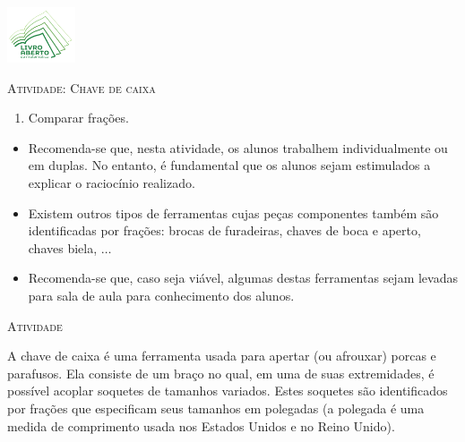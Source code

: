 \documentclass[10 pt,usenames,dvipsnames, oneside]{article}
\begin{document}
\begin{center}
  \begin{minipage}[l]{3cm}
\includegraphics[width=2cm]{../../../Figuras/logo}       
\end{minipage}\hfill
\begin{minipage}[r]{.8\textwidth}
 {\Large \scshape Atividade: Chave de caixa}  
\end{minipage}
\end{center}
\vspace{.2cm}

\ifdefined\prof
\begin{goals}
\begin{enumerate}
\item       Comparar frações.
\end{enumerate}

\tcblower

\begin{itemize}
\item       Recomenda-se que, nesta atividade, os alunos trabalhem
individualmente ou em duplas. No entanto, é fundamental que os alunos sejam
estimulados a explicar o raciocínio realizado.
    \item       Existem outros tipos de ferramentas cujas peças componentes
também são identificadas por frações: brocas de furadeiras, chaves de boca e
aperto, chaves biela,       $\ldots$
    \item       Recomenda-se que, caso seja viável, algumas destas ferramentas
sejam levadas para sala de aula para conhecimento dos alunos.
\end{itemize}
\end{goals}

\bigskip
\begin{center}
{\large \scshape Atividade}
\end{center}
\fi

A chave de caixa é uma ferramenta usada para apertar (ou afrouxar) porcas e parafusos. Ela consiste
de um braço no qual, em uma de suas extremidades, é possível acoplar soquetes de tamanhos variados.
Estes soquetes são identificados por frações que especificam seus tamanhos em polegadas (a polegada é uma medida de comprimento usada nos Estados Unidos e no Reino Unido).
\end{document}
